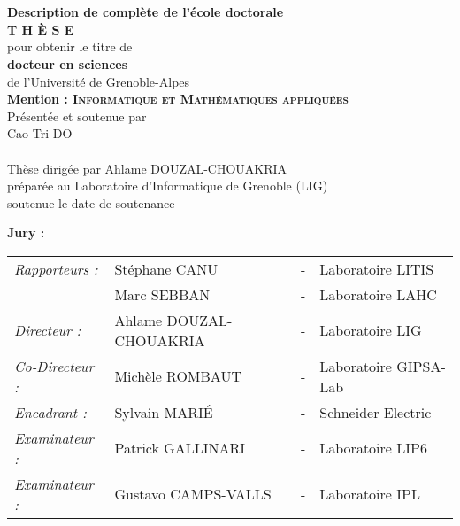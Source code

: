 \cleardoublepage
\begin{titlepage}
\begin{center}
 \\
\vspace*{0.3cm}
 \\
\noindent \textbf{Description de complète de l'école doctorale} \\
\vspace*{0.5cm}
\noindent \Huge \textbf{T H È S E} \\
\vspace*{0.3cm}
\noindent \large {pour obtenir le titre de} \\
\vspace*{0.3cm}
\noindent \LARGE \textbf{docteur en sciences} \\
\vspace*{0.3cm}
\noindent \Large de l'Université de Grenoble-Alpes\\
\noindent \Large \textbf{Mention : \textsc{Informatique et Mathématiques appliquées}}\\
\vspace*{0.4cm}
\noindent \large {Présentée et soutenue par\\}
\noindent \LARGE Cao Tri DO \\
\vspace*{0.8cm}
 \\
\vspace*{0.8cm}
\noindent \Large Thèse dirigée par Ahlame DOUZAL-CHOUAKRIA\\
\vspace*{0.2cm}
\noindent \Large préparée au Laboratoire d'Informatique de Grenoble (LIG) \\
\vspace*{0.2cm}
\noindent \large soutenue le date de soutenance \\
\vspace*{0.5cm}
\end{center}
\noindent \large \textbf{Jury :} \\
\begin{center}
\noindent \large 
\begin{tabular}{llcl}
      \textit{Rapporteurs :}	& Stéphane CANU		& - & Laboratoire LITIS\\
                				& Marc SEBBAN		& - & Laboratoire LAHC\\
      \textit{Directeur :}	    & Ahlame DOUZAL-CHOUAKRIA & - & Laboratoire LIG\\
      \textit{Co-Directeur :}	& Michèle ROMBAUT	& - & Laboratoire GIPSA-Lab\\
      \textit{Encadrant :}	    & Sylvain MARI\'{E}	& - & Schneider Electric\\
      \textit{Examinateur :}	& Patrick GALLINARI	& - & Laboratoire LIP6\\
      \textit{Examinateur :}    & Gustavo CAMPS-VALLS & - & Laboratoire IPL\\
\end{tabular}
\end{center}
\end{titlepage}
\sloppy

\titlepage

